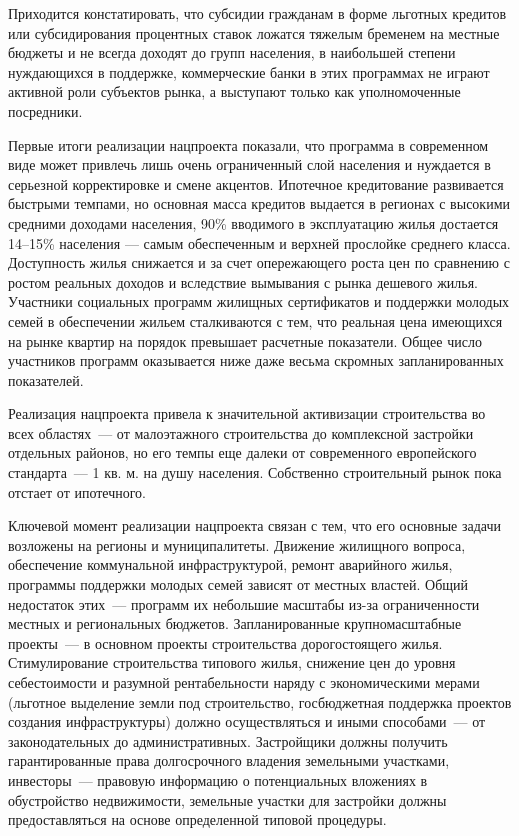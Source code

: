 \documentclass[article, 12pt, russian, oneside]{ncc}
\begin{document}
Приходится констатировать, что субсидии гражданам в форме льготных
кредитов или субсидирования процентных ставок ложатся тяжелым бременем
на местные бюджеты и не всегда доходят до групп населения, в
наибольшей степени нуждающихся в поддержке, коммерческие банки в этих
программах не играют активной роли субъектов рынка, а выступают только
как уполномоченные посредники.

Первые итоги реализации нацпроекта показали, что программа в
современном виде может привлечь лишь очень ограниченный слой населения
и нуждается в серьезной корректировке и смене акцентов. Ипотечное
кредитование развивается быстрыми темпами, но основная масса кредитов
выдается в регионах с высокими средними доходами населения, 90\%
вводимого в эксплуатацию жилья достается 14--15\% населения — самым
обеспеченным и верхней прослойке среднего класса. Доступность жилья
снижается и за счет опережающего роста цен по сравнению с ростом
реальных доходов и вследствие вымывания с рынка дешевого
жилья. Участники социальных программ жилищных сертификатов и поддержки
молодых семей в обеспечении жильем сталкиваются с тем, что реальная
цена имеющихся на рынке квартир на порядок превышает расчетные
показатели. Общее число участников программ оказывается ниже даже
весьма скромных запланированных показателей.

Реализация нацпроекта привела к значительной активизации строительства
во всех областях~--- от малоэтажного строительства до комплексной
застройки отдельных районов, но его темпы еще далеки от современного
европейского стандарта~--- 1 кв. м. на душу населения. Собственно
строительный рынок пока отстает от ипотечного.

Ключевой момент реализации нацпроекта связан с тем, что его основные
задачи возложены на регионы и муниципалитеты. Движение жилищного
вопроса, обеспечение коммунальной инфраструктурой, ремонт аварийного
жилья, программы поддержки молодых семей зависят от местных властей.
Общий недостаток этих~--- программ их небольшие масштабы из-за
ограниченности местных и региональных бюджетов. Запланированные
крупномасштабные проекты~--- в основном проекты строительства
дорогостоящего жилья. Стимулирование строительства типового жилья,
снижение цен до уровня себестоимости и разумной рентабельности наряду
с экономическими мерами (льготное выделение земли под строительство,
госбюджетная поддержка проектов создания инфраструктуры) должно
осуществляться и иными способами~--- от законодательных до
административных. Застройщики должны получить гарантированные права
долгосрочного владения земельными участками, инвесторы~--- правовую
информацию о потенциальных вложениях в обустройство недвижимости,
земельные участки для застройки должны предоставляться на основе
определенной типовой процедуры.
\newpage
\end{document}
